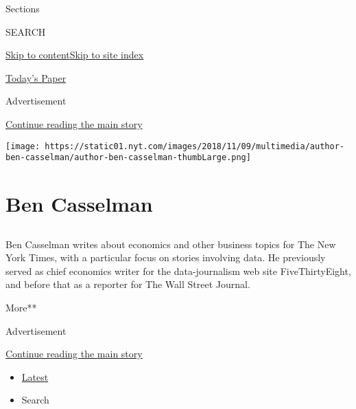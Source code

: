 Sections

SEARCH

\protect\hyperlink{site-content}{Skip to
content}\protect\hyperlink{site-index}{Skip to site index}

\href{https://myaccount.nytimes.com/auth/login?response_type=cookie\&client_id=vi}{}

\href{https://www.nytimes.com/section/todayspaper}{Today's Paper}

Advertisement

\protect\hyperlink{after-top}{Continue reading the main story}

\texttt{[image: https://static01.nyt.com/images/2018/11/09/multimedia/author-ben-casselman/author-ben-casselman-thumbLarge.png]}

\hypertarget{ben-casselman}{%
\section{Ben Casselman}\label{ben-casselman}}

\hypertarget{section}{%
\subsection{}\label{section}}

Ben Casselman writes about economics and other business topics for The
New York Times, with a particular focus on stories involving data. He
previously served as chief economics writer for the data-journalism web
site FiveThirtyEight, and before that as a reporter for The Wall Street
Journal.

More**

Advertisement

\protect\hyperlink{after-mid1}{Continue reading the main story}

\begin{itemize}
\tightlist
\item
  \protect\hyperlink{stream-panel}{Latest}
\item
  Search
\end{itemize}

